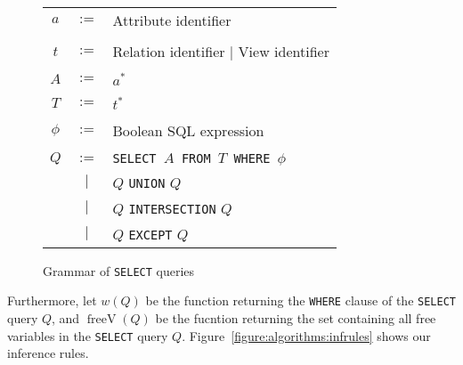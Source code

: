 \begin{figure}[!ht]

\begin{tabular}{c c l}
$a$ & $:=$ & Attribute identifier \\
    & & \\
$t$ & $:=$ & Relation identifier $|$ View identifier \\ \\

$A$ & $:=$ & $a^*$ \\
    & & \\
$T$ & $:=$ &  $t^*$ \\
    & & \\
$\phi$ & $:=$ & Boolean SQL expression  \\
    & & \\
$Q$ & $:=$ & \texttt{SELECT $A$ FROM $T$ WHERE $\phi$} \\
    & $|$  & $Q$ \texttt{UNION} $Q$ \\
    & $|$  & $Q$ \texttt{INTERSECTION} $Q$ \\
    & $|$  & $Q$ \texttt{EXCEPT} $Q$ \\

\end{tabular}
\caption{Grammar of \texttt{SELECT} queries}
\label{figure:algorithms:grammar}
\end{figure}
%
Furthermore, let $w(Q)$ be the function returning the \texttt{WHERE} clause of the \texttt{SELECT} query $Q$, and $\operatorname{freeV}(Q)$ be the fucntion returning the set containing all free variables in the \texttt{SELECT} query $Q$. 
%
Figure~\ref{figure:algorithms:infrules} shows our inference rules.
%
